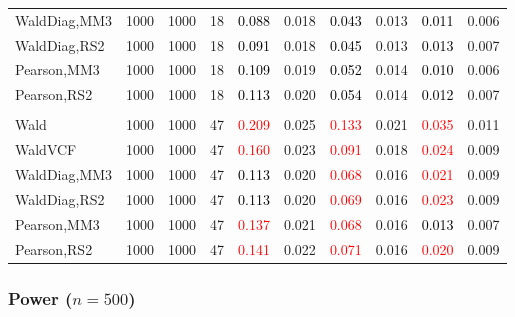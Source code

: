 \documentclass[
]{article}
\begin{document}
\begin{table}[H]
{\begin{tabular}[t]{lrrrrrrlrr}
\hspace{1em}WaldDiag,MM3 & 1000 & 1000 & 18 & \textcolor{black}{0.088} & 0.018 & \textcolor{black}{0.043} & 0.013 & \textcolor{black}{0.011} & 0.006\\
\hspace{1em}WaldDiag,RS2 & 1000 & 1000 & 18 & \textcolor{black}{0.091} & 0.018 & \textcolor{black}{0.045} & 0.013 & \textcolor{black}{0.013} & 0.007\\
\hspace{1em}Pearson,MM3 & 1000 & 1000 & 18 & \textcolor{black}{0.109} & 0.019 & \textcolor{black}{0.052} & 0.014 & \textcolor{black}{0.010} & 0.006\\
\hspace{1em}Pearson,RS2 & 1000 & 1000 & 18 & \textcolor{black}{0.113} & 0.020 & \textcolor{black}{0.054} & 0.014 & \textcolor{black}{0.012} & 0.007\\
\addlinespace[0.3em]
\multicolumn{10}{l}{\textbf{3F 15V}}\\
\hspace{1em}Wald & 1000 & 1000 & 47 & \textcolor{red}{0.209} & 0.025 & \textcolor{red}{0.133} & 0.021 & \textcolor{red}{0.035} & 0.011\\
\hspace{1em}WaldVCF & 1000 & 1000 & 47 & \textcolor{red}{0.160} & 0.023 & \textcolor{red}{0.091} & 0.018 & \textcolor{red}{0.024} & 0.009\\
\hspace{1em}WaldDiag,MM3 & 1000 & 1000 & 47 & \textcolor{black}{0.113} & 0.020 & \textcolor{red}{0.068} & 0.016 & \textcolor{red}{0.021} & 0.009\\
\hspace{1em}WaldDiag,RS2 & 1000 & 1000 & 47 & \textcolor{black}{0.113} & 0.020 & \textcolor{red}{0.069} & 0.016 & \textcolor{red}{0.023} & 0.009\\
\hspace{1em}Pearson,MM3 & 1000 & 1000 & 47 & \textcolor{red}{0.137} & 0.021 & \textcolor{red}{0.068} & 0.016 & \textcolor{black}{0.013} & 0.007\\
\hspace{1em}Pearson,RS2 & 1000 & 1000 & 47 & \textcolor{red}{0.141} & 0.022 & \textcolor{red}{0.071} & 0.016 & \textcolor{red}{0.020} & 0.009\\
\bottomrule
\end{tabular}}
\endgroup{}
\end{table}

\hypertarget{power-n500-2}{%
\subsubsection{\texorpdfstring{Power
(\(n=500\))}{Power (n=500)}}\label{power-n500-2}}
\end{document}
